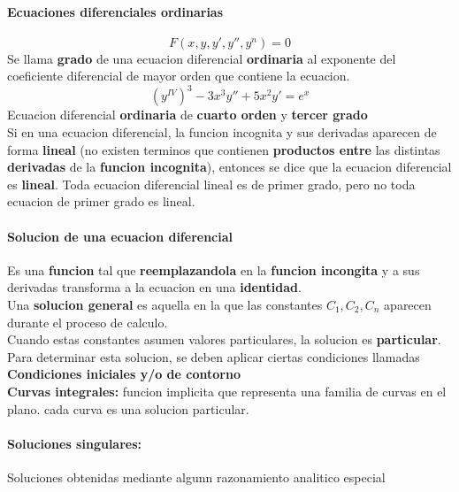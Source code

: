 \documentclass[11pt]{article}
\begin{document}
\paragraph{Ecuaciones diferenciales ordinarias}
\begin{equation*}
	F(x, y, y', y'', y^n) = 0
\end{equation*}
Se llama \textbf{grado} de una ecuacion diferencial \textbf{ordinaria} al exponente del coeficiente diferencial de mayor orden que contiene la ecuacion.
\begin{equation*}
	(y^{IV})^3 - 3x^3y''+5x^2y' = e^x
\end{equation*}
Ecuacion diferencial \textbf{ordinaria} de \textbf{cuarto orden} y \textbf{tercer grado}\\
\linebreak
Si en una ecuacion diferencial, la funcion incognita y sus derivadas aparecen de forma \textbf{lineal} (no existen terminos que contienen \textbf{productos entre} las distintas \textbf{derivadas} de la \textbf{funcion incognita}), entonces se dice que la ecuacion diferencial es \textbf{lineal}.  Toda ecuacion diferencial lineal es de primer grado, pero no toda ecuacion de primer grado es lineal.\\
\linebreak
\paragraph{Solucion de una ecuacion diferencial}
Es una \textbf{funcion} tal que \textbf{reemplazandola} en la \textbf{funcion incongita} y a sus derivadas transforma a la ecuacion en una \textbf{identidad}.\\
Una \textbf{solucion general} es aquella en la que las constantes $C_1, C_2, C_n$ aparecen durante el proceso de calculo.\\
Cuando estas constantes asumen valores particulares, la solucion es \textbf{particular}.\\
Para determinar esta solucion, se deben aplicar ciertas condiciones llamadas \textbf{Condiciones iniciales y/o de contorno}\\
\linebreak
\textbf{Curvas integrales:} funcion implicita que representa una familia de curvas en el plano. cada curva es una solucion particular.\\
\linebreak
\paragraph{Soluciones singulares:} Soluciones obtenidas mediante algunn razonamiento analitico especial
\end{document}
